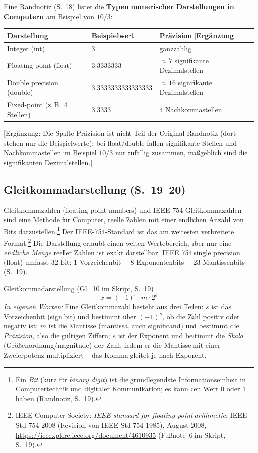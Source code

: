 Eine Randnotiz (S.~18) listet die \textbf{Typen numerischer Darstellungen in Computern} am Beispiel von $10/3$:
\begin{center}
\begin{tabular}{lll}
\toprule
Darstellung & Beispielwert & Präzision [Ergänzung] \\
\midrule
Integer (int) & $3$ & ganzzahlig \\
Floating-point (float) & $3.3333333$ & $\approx 7$ signifikante Dezimalstellen \\
Double precision (double) & $3.3333333333333333$ & $\approx 16$ signifikante Dezimalstellen \\
Fixed-point (z.\,B.\ 4 Stellen) & $3.3333$ & 4 Nachkommastellen \\
\bottomrule
\end{tabular}
\end{center}
[Ergänzung: Die Spalte \glqq Präzision\grqq{} ist nicht Teil der Original-Randnotiz (dort stehen nur die Beispielwerte); bei float/double fallen signifikante Stellen und Nachkommastellen im Beispiel $10/3$ nur zufällig zusammen, maßgeblich sind die signifikanten Dezimalstellen.]

\subsection{Gleitkommadarstellung (S.~19--20)}

\begin{defbox}{Gleitkommazahlen (floating-point numbers) und IEEE 754}
Gleitkommazahlen sind eine Methode für Computer, reelle Zahlen mit einer endlichen Anzahl von Bits darzustellen.\footnote{Ein \emph{Bit} (kurz für \emph{binary digit}) ist die grundlegendste Informationseinheit in Computertechnik und digitaler Kommunikation; es kann den Wert 0 oder 1 haben (Randnotiz, S.~19).} Der IEEE-754-Standard ist das am weitesten verbreitete Format.\footnote{IEEE Computer Society: \emph{IEEE standard for floating-point arithmetic}, IEEE Std 754-2008 (Revision von IEEE Std 754-1985), August 2008, \url{https://ieeexplore.ieee.org/document/4610935} (Fußnote~6 im Skript, S.~19).} Die Darstellung erlaubt einen weiten Wertebereich, aber nur eine \emph{endliche Menge} reeller Zahlen ist exakt darstellbar. IEEE 754 single precision (float) umfasst 32 Bit: 1 Vorzeichenbit + 8 Exponentenbits + 23 Mantissenbits (S.~19).
\end{defbox}

\begin{satzbox}{Gleitkommadarstellung (Gl.~10 im Skript, S.~19)}
\[
x = (-1)^s \cdot m \cdot 2^e
\]
\emph{In eigenen Worten:} Eine Gleitkommazahl besteht aus drei Teilen: $s$ ist das Vorzeichenbit (sign bit) und bestimmt über $(-1)^s$, ob die Zahl positiv oder negativ ist; $m$ ist die Mantisse (mantissa, auch significand) und bestimmt die \emph{Präzision}, also die gültigen Ziffern; $e$ ist der Exponent und bestimmt die \emph{Skala} (Größenordnung/magnitude) der Zahl, indem er die Mantisse mit einer Zweierpotenz multipliziert -- das Komma \glqq gleitet\grqq{} je nach Exponent.
\end{satzbox}

